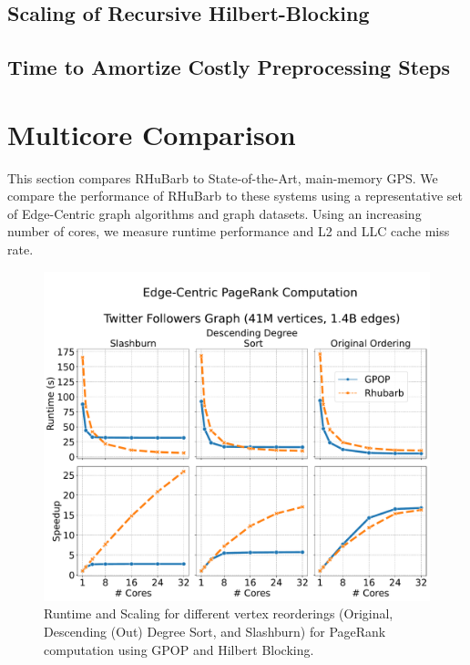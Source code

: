 \subsection{Scaling of Recursive Hilbert-Blocking}
\subsection{Time to Amortize Costly Preprocessing Steps}
\section{Multicore Comparison} \label{sec:multicore}
This section compares RHuBarb to State-of-the-Art, main-memory GPS.
We compare the performance of RHuBarb to these systems using a representative set of Edge-Centric graph algorithms and graph datasets. Using an increasing number of cores, we measure runtime performance and L2 and LLC cache miss rate.

\begin{figure}[!htb]
    \centering
    \includegraphics[width=5in]{plots/eval/twitter-sample.pdf}
    \caption{Runtime and Scaling for different vertex reorderings (Original, Descending (Out) Degree Sort, and  Slashburn) for PageRank computation using GPOP and Hilbert Blocking.}
    \label{fig:eval-sample}   %
    \end{figure}


